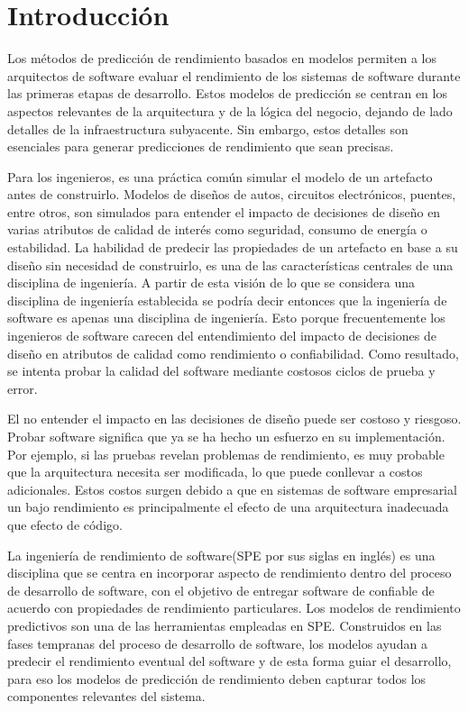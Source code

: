 \documentclass[11pt, twoside]{report}
\begin{document}
\chapter*{Introducción}
Los métodos de predicción de rendimiento basados en modelos permiten a los arquitectos de software evaluar el rendimiento de los sistemas de software durante las primeras etapas de desarrollo. Estos modelos de predicción se centran en los aspectos relevantes de la arquitectura y de la lógica del negocio, dejando de lado detalles de la infraestructura subyacente. Sin embargo, estos detalles son esenciales para generar predicciones de rendimiento que sean precisas.

Para los ingenieros, es una práctica común simular el modelo de un artefacto antes de construirlo. Modelos de diseños de autos, circuitos electrónicos, puentes, entre otros, son simulados para entender el impacto de decisiones de diseño en varias atributos de calidad de interés como seguridad, consumo de energía o estabilidad. La habilidad de predecir las propiedades de un artefacto en base a su diseño sin necesidad de construirlo, es una de las características centrales de una disciplina de ingeniería. A partir de esta visión de lo que se considera una disciplina de ingeniería establecida se podría decir entonces que la ingeniería de software es apenas una disciplina de ingeniería\cite{palladio-blue-book}. Esto porque frecuentemente los ingenieros de software carecen del entendimiento del impacto de decisiones de diseño en atributos de calidad como rendimiento o confiabilidad. Como resultado, se intenta probar la calidad del software mediante costosos ciclos de prueba y error.

El no entender el impacto en las decisiones de diseño puede ser costoso y riesgoso. Probar software significa que ya se ha hecho un esfuerzo en su implementación. Por ejemplo, si las pruebas revelan problemas de rendimiento, es muy probable que la arquitectura necesita ser modificada, lo que puede conllevar a costos adicionales. Estos costos surgen debido a que en sistemas de software empresarial un bajo rendimiento es principalmente el efecto de una arquitectura inadecuada que efecto de código.

La ingeniería de rendimiento de software(SPE por sus siglas en inglés) es una disciplina que se centra en incorporar aspecto de rendimiento dentro del proceso de desarrollo de software, con el objetivo de entregar software de confiable de acuerdo con propiedades de rendimiento particulares. Los modelos de rendimiento predictivos son una de las herramientas empleadas en SPE. Construidos en las fases tempranas del proceso de desarrollo de software, los modelos ayudan a predecir el rendimiento eventual del software y de esta forma guiar el desarrollo, para eso los modelos de predicción de rendimiento deben capturar todos los componentes relevantes del sistema.
\end{document}
